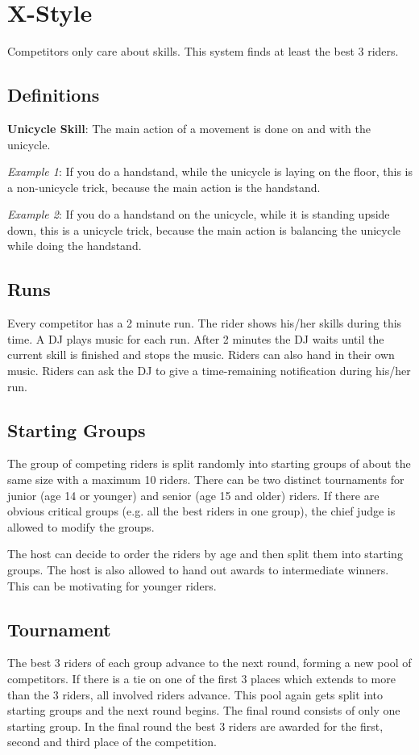 \chapter{X-Style}
Competitors only care about skills.
This system finds at least the best 3 riders.

\section{Definitions}
\textbf{Unicycle Skill}: The main action of a movement is done on and with the unicycle.

\textit{Example 1}: If you do a handstand, while the unicycle is laying on the floor, this is a non-unicycle trick, because the main action is the handstand.

\textit{Example 2}: If you do a handstand on the unicycle, while it is standing upside down, this is a unicycle trick, because the main action is balancing the unicycle while doing the handstand.

\section{Runs}
Every competitor has a 2 minute run.
The rider shows his/her skills during this time.
A DJ plays music for each run.
After 2 minutes the DJ waits until the current skill is finished and stops the music. 
Riders can also hand in their own music.
Riders can ask the DJ to give a time-remaining notification during his/her run.

\section{Starting Groups}
The group of competing riders is split randomly into starting groups of about the same size with a maximum 10 riders.
There can be two distinct tournaments for junior (age 14 or younger) and senior (age 15 and older) riders.
If there are obvious critical groups (e.g. all the best riders in one group), the chief judge is allowed to modify the groups.

The host can decide to order the riders by age and then split them into starting groups.
The host is also allowed to hand out awards to intermediate winners.
This can be motivating for younger riders.

\section{Tournament}
The best 3 riders of each group advance to the next round, forming a new pool of competitors.
If there is a tie on one of the first 3 places which extends to more than the 3 riders, all involved riders advance.
This pool again gets split into starting groups and the next round begins.
The final round consists of only one starting group.
In the final round the best 3 riders are awarded for the first, second and third place of the competition.

